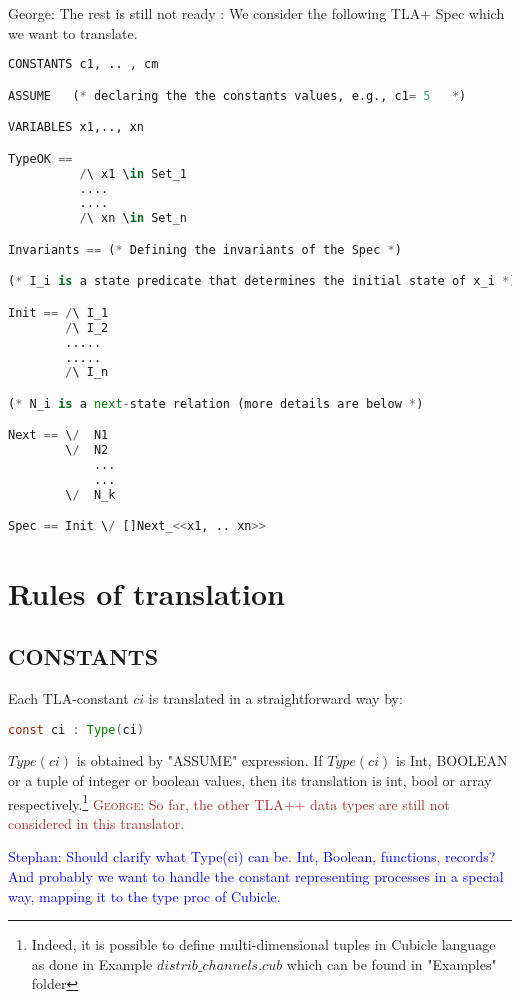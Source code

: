 \documentclass{article}
\theoremstyle{plain}
\numberwithin{equation}{section}
\newcommand{\george}[1]{\textcolor{brown}{\textsc{George: } {\sf #1}}}
\newcommand{\ste}[1]{\par\noindent\textcolor{blue}{\small Stephan: #1}}
\begin{document}
\color{red} George: The rest is still not ready : 
We consider the following TLA+ Spec which we want to translate.

\begin{lstlisting}[language=Python]
CONSTANTS c1, .. , cm

ASSUME   (* declaring the the constants values, e.g., c1= 5   *)  

VARIABLES x1,.., xn

TypeOK == 
          /\ x1 \in Set_1
          ....
          ....
          /\ xn \in Set_n

Invariants == (* Defining the invariants of the Spec *)           

(* I_i is a state predicate that determines the initial state of x_i *)

Init == /\ I_1    
        /\ I_2 
        .....
        .....
        /\ I_n 

(* N_i is a next-state relation (more details are below *)

Next == \/  N1 
        \/  N2 
            ...
            ...
        \/  N_k 

Spec == Init \/ []Next_<<x1, .. xn>>        
\end{lstlisting}
 

\section*{Rules of translation}

 
\subsection*{CONSTANTS} Each TLA-constant $ci$ is  translated in a straightforward  way  by:  
   
\begin{lstlisting}[language=Java]
const ci : Type(ci) 
\end{lstlisting}

\emph{$Type(ci)$} is obtained by "ASSUME" expression. If \emph{$Type(ci)$} is Int, BOOLEAN or a tuple of integer or boolean values, then its translation is int,  bool or array respectively.\footnote{Indeed, it is possible to define multi-dimensional tuples in Cubicle language as done in Example \emph{$distrib\_channels.cub$} which can be found in "Examples" folder} \george{So far, the other TLA++ data types are still not considered in this translator.  }  

\ste{Should clarify what Type(ci) can be. Int, Boolean, functions, records? And
  probably we want to handle the constant representing processes in a special
  way, mapping it to the type proc of Cubicle.}
\end{document}
